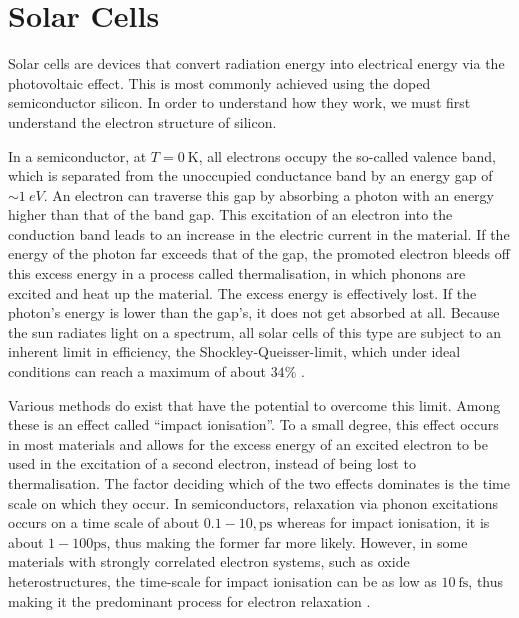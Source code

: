 \section{Solar Cells}

Solar cells are devices that convert radiation energy into electrical energy via the photovoltaic effect. This is most commonly achieved using the doped semiconductor silicon. In order to understand how they work, we must first understand the electron structure of silicon.
\medskip

In a semiconductor, at $T=\SI{0}{\kelvin}$, all electrons occupy the so-called valence band, which is separated from the unoccupied conductance band by an energy gap of $\sim \SI{1}{eV}$. An electron can traverse this gap by absorbing a photon with an energy higher than that of the band gap. This excitation of an electron into the conduction band leads to an increase in the electric current in the material. If the energy of the photon far exceeds that of the gap, the promoted electron bleeds off this excess energy in a process called thermalisation, in which phonons are excited and heat up the material. The excess energy is effectively lost. If the photon's energy is lower than the gap's, it does not get absorbed at all. Because the sun radiates light on a spectrum, all solar cells  of this type are subject to an inherent limit in efficiency, the Shockley-Queisser-limit, which under ideal conditions can reach a maximum of about $34\%$ \cite{shockley_queisser}.

\medskip

Various methods do exist that have the potential to overcome this limit. Among these is an effect called ``impact ionisation''. To a small degree, this effect occurs in most materials and allows for the excess energy of an excited electron to be used in the excitation of a second electron, instead of being lost to thermalisation. The factor deciding which of the two effects dominates is the time scale on which they occur. In semiconductors, relaxation via phonon excitations occurs on a time scale of about $0.1 - 10, \si{\pico\second}$ whereas for impact ionisation, it is about $1-100\si{\pico\second}$, thus making the former far more likely. However, in some materials with strongly correlated electron systems, such as oxide heterostructures, the time-scale for impact ionisation can be as low as $\SI{10}{\femto\second}$, thus making it the predominant process for electron relaxation \cite{time_scales}.




